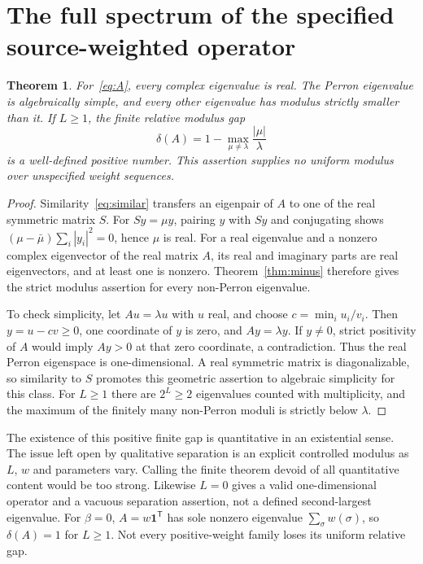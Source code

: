 \documentclass[11pt]{article}
\newtheorem{theorem}{Theorem}[section]
\begin{document}
\section{The full spectrum of the specified source-weighted operator}
\begin{theorem}\label{thm:whole}
For~\eqref{eq:A}, every complex eigenvalue is real. The Perron eigenvalue is
algebraically simple, and every other eigenvalue has modulus strictly smaller
than it. If $L\ge1$, the finite relative modulus gap
\[
 \delta(A)=1-\max_{\mu\ne\lambda}\frac{|\mu|}{\lambda}
\]
is a well-defined positive number. This assertion supplies no uniform modulus
over unspecified weight sequences.
\end{theorem}
\begin{proof}
Similarity~\eqref{eq:similar} transfers an eigenpair of $A$ to one of the real
symmetric matrix $S$. For $Sy=\mu y$, pairing $y$ with $Sy$ and conjugating
shows $(\mu-\bar\mu)\sum_i|y_i|^2=0$, hence $\mu$ is real.
For a real eigenvalue and a nonzero complex eigenvector of the real matrix $A$,
its real and imaginary parts are real eigenvectors, and at least one is nonzero.
Theorem~\ref{thm:minus} therefore gives the strict modulus assertion for every
non-Perron eigenvalue.

To check simplicity, let $Au=\lambda u$ with $u$ real, and choose
$c=\min_i u_i/v_i$. Then $y=u-cv\ge0$, one coordinate of $y$ is zero, and
$Ay=\lambda y$. If $y\ne0$, strict positivity of $A$ would imply $Ay>0$ at
that zero coordinate, a contradiction. Thus the real Perron eigenspace is
one-dimensional. A real symmetric matrix is diagonalizable, so similarity to
$S$ promotes this geometric assertion to algebraic simplicity for this class.
For $L\ge1$ there are $2^L\ge2$ eigenvalues counted with multiplicity, and the
maximum of the finitely many non-Perron moduli is strictly below $\lambda$.
\end{proof}

The existence of this positive finite gap is quantitative in an existential
sense. The issue left open by qualitative separation is an explicit controlled
modulus as $L$, $w$ and parameters vary. Calling the finite theorem devoid of
all quantitative content would be too strong. Likewise $L=0$ gives a valid
one-dimensional operator and a vacuous separation assertion, not a defined
second-largest eigenvalue. For $\beta=0$, $A=w\mathbf1^{\mathsf T}$ has sole
nonzero eigenvalue $\sum_\sigma w(\sigma)$, so $\delta(A)=1$ for $L\ge1$.
Not every positive-weight family loses its uniform relative gap.
\end{document}
